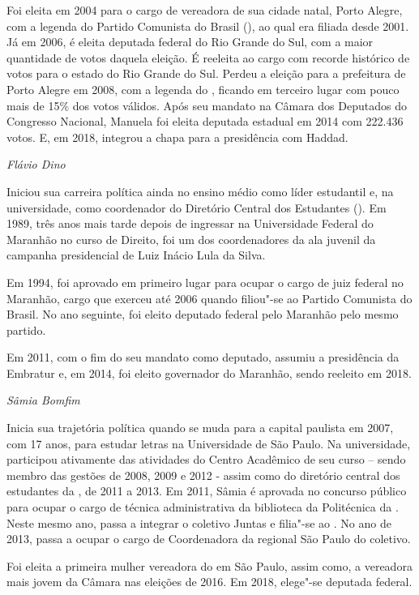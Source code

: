 Foi eleita em 2004 para o cargo de vereadora de sua cidade natal, Porto
Alegre, com a legenda do Partido Comunista do Brasil (), ao qual
era filiada desde 2001. Já em 2006, é eleita deputada federal do Rio
Grande do Sul, com a maior quantidade de votos daquela eleição. É
reeleita ao cargo com recorde histórico de votos para o estado do Rio
Grande do Sul. Perdeu a eleição para a prefeitura de Porto Alegre em
2008, com a legenda do , ficando em terceiro lugar com pouco mais
de 15\% dos votos válidos. Após seu mandato na Câmara dos Deputados do
Congresso Nacional, Manuela foi eleita deputada estadual em 2014 com
222.436 votos. E, em 2018, integrou a chapa para a presidência com
Haddad.

\emph{Flávio Dino}

Iniciou sua carreira política ainda no ensino médio como líder
estudantil e, na universidade, como coordenador do Diretório Central dos
Estudantes (). Em 1989, três anos mais tarde depois de ingressar na
Universidade Federal do Maranhão no curso de Direito, foi um dos
coordenadores da ala juvenil da campanha presidencial de Luiz Inácio
Lula da Silva.

Em 1994, foi aprovado em primeiro lugar para ocupar o cargo de juiz
federal no Maranhão, cargo que exerceu até 2006 quando filiou"-se ao
Partido Comunista do Brasil. No ano seguinte, foi eleito deputado
federal pelo Maranhão pelo mesmo partido.

Em 2011, com o fim do seu mandato como deputado, assumiu a presidência
da Embratur e, em 2014, foi eleito governador do Maranhão, sendo
reeleito em 2018.

\emph{Sâmia Bomfim}

Inicia sua trajetória política quando se muda para a capital paulista em
2007, com 17 anos, para estudar letras na Universidade de São Paulo. Na
universidade, participou ativamente das atividades do Centro Acadêmico
de seu curso -- sendo membro das gestões de 2008, 2009 e 2012 - assim
como do diretório central dos estudantes da , de 2011 a 2013. Em
2011, Sâmia é aprovada no concurso público para ocupar o cargo de
técnica administrativa da biblioteca da Politécnica da . Neste mesmo
ano, passa a integrar o coletivo Juntas e filia"-se ao . No ano de
2013, passa a ocupar o cargo de Coordenadora da regional São Paulo do
coletivo.

Foi eleita a primeira mulher vereadora do  em São Paulo, assim como,
a vereadora mais jovem da Câmara nas eleições de 2016. Em 2018, elege"-se
deputada federal.

